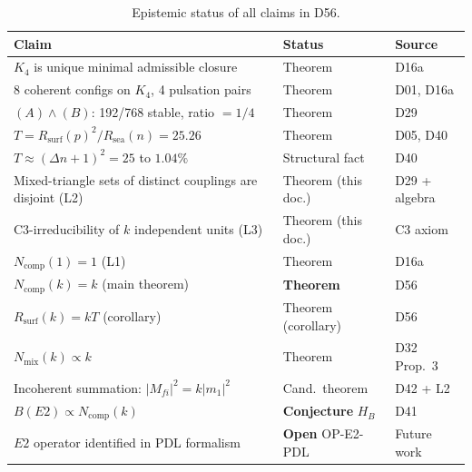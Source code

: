 \documentclass[11pt,a4paper]{article}
\theoremstyle{definition}
\theoremstyle{remark}
\newcommand{\Kfour}{K_4}
\newcommand{\Rsurf}{R_{\mathrm{surf}}}
\newcommand{\Rsea}{R_{\mathrm{sea}}}
\newcommand{\Tpdl}{T}
\newcommand{\Dn}{\Delta n}
\newcommand{\Ncomp}{N_{\mathrm{comp}}}
\begin{document}
\begin{table}[H]
\centering
\caption{Epistemic status of all claims in D56.}
\label{tab:epistemic}
\small
\begin{tabular}{p{7cm}p{3.5cm}p{3cm}}
\toprule
Claim & Status & Source \\
\midrule
$\Kfour$ is unique minimal admissible closure & Theorem & D16a \\
8 coherent configs on $\Kfour$, 4 pulsation pairs & Theorem & D01, D16a \\
$(A)\wedge(B)$: 192/768 stable, ratio $= 1/4$ & Theorem & D29 \\
$\Tpdl = \Rsurf(p)^2/\Rsea(n) = 25.26$ & Theorem & D05, D40 \\
$\Tpdl \approx (\Dn+1)^2 = 25$ to $1.04\%$ & Structural fact & D40 \\
\midrule
Mixed-triangle sets of distinct couplings are disjoint (L2) & Theorem (this doc.) & D29 + algebra \\
C3-irreducibility of $k$ independent units (L3) & Theorem (this doc.) & C3 axiom \\
$\Ncomp(1) = 1$ (L1) & Theorem & D16a \\
$\Ncomp(k) = k$ (main theorem) & \textbf{Theorem} & D56 \\
$\Rsurf(k) = k\Tpdl$ (corollary) & Theorem (corollary) & D56 \\
\midrule
$N_{\mathrm{mix}}(k) \propto k$ & Theorem & D32 Prop.~3 \\
Incoherent summation: $|M_{fi}|^2 = k|m_1|^2$ & Cand.\ theorem & D42 + L2 \\
$B(E2) \propto \Ncomp(k)$ & \textbf{Conjecture} $H_B$ & D41 \\
$E2$ operator identified in PDL formalism & \textbf{Open} OP-E2-PDL & Future work \\
\bottomrule
\end{tabular}
\end{table}

\clearpage



\end{document}
